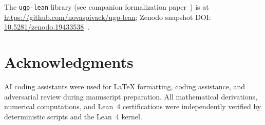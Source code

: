 \documentclass[11pt]{article}
\begin{document}
\bigskip
\noindent The \texttt{ugp-lean} library (see companion formalization paper~\cite{SpivackUGPFormalization}) is at \url{https://github.com/novaspivack/ugp-lean}; Zenodo snapshot DOI: \href{https://doi.org/10.5281/zenodo.19433538}{10.5281/zenodo.19433538}~\cite{SpivackUGPFormalization}.





\section*{Acknowledgments}

AI coding assistants were used for LaTeX formatting, coding assistance, and adversarial review during manuscript preparation. All mathematical derivations, numerical computations, and Lean~4 certifications were independently verified by deterministic scripts and the Lean~4 kernel.
\end{document}

